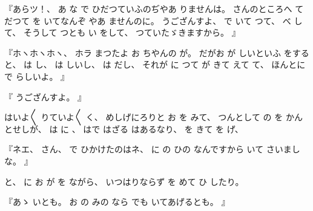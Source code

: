 %
『あらツ！、
%
あ
な
で
ひだつていふのぢやあ
りませんは。
%
さんのところへ
て
だつて
を
いてなんぞ
やあ
ませんのに。
%
うござんすよ、
%
で
いて
つて、
%
べ
して、
%
そうして
つとも
い
をして、
%
つていたゞきますから。
』

%
『ホヽホヽホヽ、
%
ホラ
まつたよ
お
ちやんの
が。
%
だがお
が
しいといふ
をすると、
%
は
し、
%
は
しいし、
%
は
だし、
%
それが
に
つて
が
きて
えて
て、
%
ほんとに
で
らしいよ。
』

%
『
うござんすよ。
』

%
はいよ〳〵
りていよ〳〵
く、
%
めしげにろりと
お
を
みて、
%
つんとして
の
を
かんとせしが、
%
は
に
、
%
はで
はざる
はあるなり、
%
を
きて
を
げ、

%
『ネエ、
%
さん、
%
で
ひかけたのはネ、
%
に
の
ひの
なんですから
いて
さいましな。
』

%
と、
%
に
お
が
を
ながら、
%
いつはりならず
を
めて
ひ
したり。

%
『あゝ
いとも。
%
お
の
みの
なら
でも
いてあげるとも。
』

